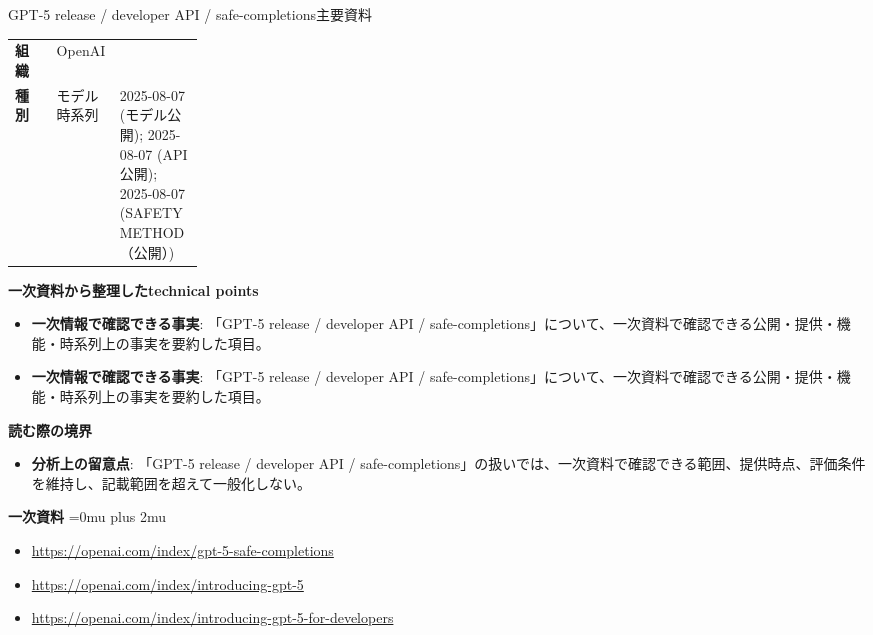 \begin{technicalnote}{GPT-5 release / developer API / safe-completions}{主要資料}
\begingroup
\begin{tabularx}{\linewidth}{@{}>{\bfseries}p{0.22\linewidth}X@{}}
組織 & OpenAI \\
種別 & モデル
時系列 & 2025-08-07 (モデル公開); 2025-08-07 (API公開); 2025-08-07 (SAFETY METHOD（公開）) \\
\end{tabularx}
\smallskip
{\bfseries 一次資料から整理したtechnical points}
\begin{itemize}[leftmargin=1.5em,itemsep=0.35em]
\item \textbf{一次情報で確認できる事実}: 「GPT-5 release / developer API / safe-completions」について、一次資料で確認できる公開・提供・機能・時系列上の事実を要約した項目。
\item \textbf{一次情報で確認できる事実}: 「GPT-5 release / developer API / safe-completions」について、一次資料で確認できる公開・提供・機能・時系列上の事実を要約した項目。
\end{itemize}
\begin{minipage}{\linewidth}
{\bfseries 読む際の境界}
\begin{itemize}[leftmargin=1.5em,itemsep=0.35em]
\item \textbf{分析上の留意点}: 「GPT-5 release / developer API / safe-completions」の扱いでは、一次資料で確認できる範囲、提供時点、評価条件を維持し、記載範囲を超えて一般化しない。
\end{itemize}
\begin{samepage}
{\bfseries 一次資料}
\begingroup\sloppy
\Urlmuskip=0mu plus 2mu\relax
\begin{itemize}[leftmargin=1.5em,itemsep=0.25em]
\item {\scriptsize\url{https://openai.com/index/gpt-5-safe-completions}}
\item {\scriptsize\url{https://openai.com/index/introducing-gpt-5}}
\item {\scriptsize\url{https://openai.com/index/introducing-gpt-5-for-developers}}
\end{itemize}
\endgroup
\end{samepage}
\end{minipage}
\endgroup
\end{technicalnote}
\medskip

